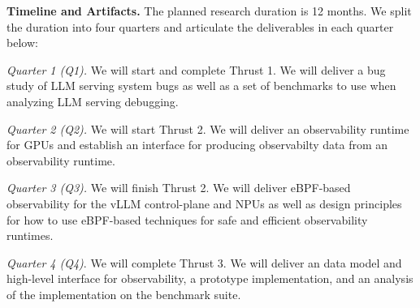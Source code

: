 
\noindent \textbf{Timeline and Artifacts.} The planned research duration is 12 months.  We split the duration into four quarters and articulate the deliverables in each quarter below:

\textit{Quarter 1 (Q1).} We will start and complete Thrust 1. We will deliver a bug study of LLM serving system bugs as well as a set of benchmarks to use when analyzing LLM serving debugging.

\textit{Quarter 2 (Q2).} We will start Thrust 2.  We will deliver an observability runtime for GPUs and establish an interface for producing observabilty data from an observability runtime.

\textit{Quarter 3 (Q3).} We will finish Thrust 2.  We will deliver eBPF-based observability for the vLLM control-plane and NPUs as well as design principles for how to use eBPF-based techniques for safe and efficient observability runtimes. 

\textit{Quarter 4 (Q4)}. We will complete Thrust 3. We will deliver an data model and high-level interface for observability, a prototype implementation, and an analysis of the implementation on the benchmark suite. 





